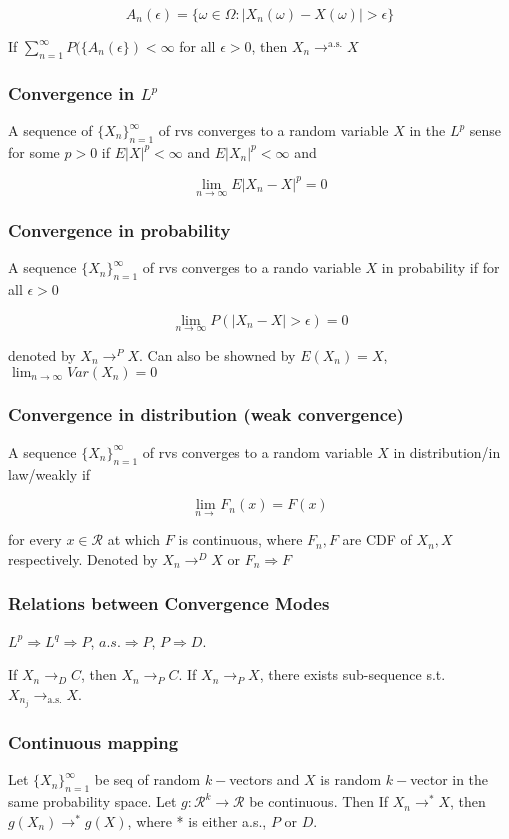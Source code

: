 $$
A_n(\epsilon) = \{\omega\in\Omega: |X_n(\omega)-X(\omega)|>\epsilon\}
$$

If $\sum_{n=1}^\infty P(\{A_n(\epsilon\})<\infty$ for all $\epsilon > 0$, then $X_n\rightarrow^{\text{a.s.}}X$


\subsubsection{Convergence in $L^p$}
A sequence of $\{X_n\}_{n=1}^\infty$ of rvs converges to a random variable $X$ in the $L^p$ sense for some $p>0$ if $E|X|^p<\infty$ and $E|X_n|^p<\infty$ and 

$$
\lim_{n\rightarrow\infty} E|X_n-X|^p = 0
$$

\subsubsection{Convergence in probability}
A sequence $\{X_n\}_{n=1}^\infty$ of rvs converges to a rando variable $X$ in probability if for all $\epsilon>0$

$$
\lim_{n\rightarrow\infty} P(|X_n-X|>\epsilon) = 0
$$

denoted by $X_n\rightarrow^P X$. Can also be showned by $E(X_n)=X$, $\lim_{n\rightarrow\infty}Var(X_n) = 0$

\subsubsection{Convergence in distribution (weak convergence)}
A sequence $\{X_n\}_{n=1}^\infty$ of rvs converges to a random variable $X$ in distribution/in law/weakly if

$$
\lim_{n\rightarrow} F_n(x) = F(x)
$$

for every $x\in\mathcal{R}$ at which $F$ is continuous, where $F_n, F$ are CDF of $X_n, X$ respectively. Denoted by $X_n\rightarrow^D X$ or $F_n\Rightarrow F$

\subsubsection{Relations between Convergence Modes}

$L^p\Rightarrow L^q\Rightarrow P$, $a.s. \Rightarrow P$, $P \Rightarrow D$.

If $X_n\rightarrow_D C$, then $X_n \rightarrow_P C$. If $X_n\rightarrow_P X$, there exists sub-sequence s.t. $X_{n_j}\rightarrow_{\text{a.s.}}X$.

\subsubsection{Continuous mapping} Let $\{X_n\}_{n=1}^\infty$ be seq of random $k-$vectors and $X$ is random $k-$vector in the same probability space. Let $g: \mathcal{R}^k\rightarrow\mathcal{R}$ be continuous. Then
If $X_n \rightarrow^{\text{*}} X$, then $g(X_n) \rightarrow^{\text{*}}g(X)$, where * is either a.s., $P$ or $D$.

